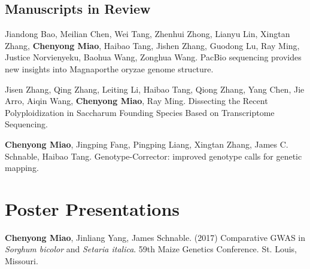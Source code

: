 \documentclass[letterpaper]{article}
\begin{document}
\subsection*{Manuscripts in Review}
\begin{etaremune}
\item Jiandong Bao, Meilian Chen, Wei Tang, Zhenhui Zhong, Lianyu Lin, Xingtan Zhang, {\bf Chenyong Miao}, Haibao Tang, Jishen Zhang, Guodong Lu, Ray Ming, Justice Norvienyeku, Baohua Wang, Zonghua Wang. PacBio sequencing provides new insights into Magnaporthe oryzae genome structure.
\item Jisen Zhang, Qing Zhang, Leiting Li, Haibao Tang, Qiong Zhang, Yang Chen, Jie Arro, Aiqin Wang, {\bf Chenyong Miao}, Ray Ming. Dissecting the Recent Polyploidization in Saccharum Founding Species Based on Transcriptome Sequencing.
\item {\bf Chenyong Miao}, Jingping Fang, Pingping Liang, Xingtan Zhang, James C. Schnable, Haibao Tang. Genotype-Corrector: improved genotype calls for genetic mapping.
\end{etaremune}


\section*{Poster Presentations}
\begin{etaremune}
\item {\bf Chenyong Miao}, Jinliang Yang, James Schnable. (2017) Comparative GWAS in \textit{Sorghum bicolor} and \textit{Setaria italica}. 59th Maize Genetics Conference. St. Louis, Missouri. 
\end{etaremune}
\end{document}
